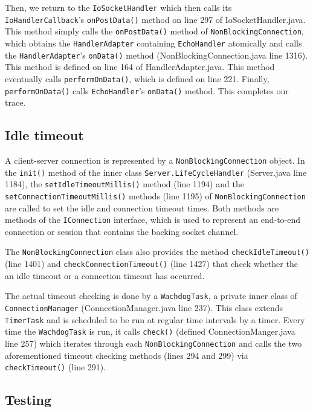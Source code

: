 \documentclass[letterpaper,12pt]{article}
\begin{document}
Then, we return to the \texttt{IoSocketHandler} which then calls its \texttt{IoHandlerCallback}'s \texttt{onPostData()} method on line 297 of IoSocketHandler.java. This method simply calls the \texttt{onPostData()} method of \texttt{NonBlockingConnection}, which obtains the \texttt{HandlerAdapter} containing \texttt{EchoHandler} atomically and calls the \texttt{HandlerAdapter}'s \texttt{onData()} method (NonBlockingConnection.java line 1316). This method is defined on line 164 of HandlerAdapter.java. This method eventually calls \texttt{performOnData()}, which is defined on line 221. Finally, \texttt{performOnData()} calls \texttt{EchoHandler}'s \texttt{onData()} method. This completes our trace.

\subsection{Idle timeout}

A client-server connection is represented by a \texttt{NonBlockingConnection} object. In the \texttt{init()} method of the inner class \texttt{Server.LifeCycleHandler} (Server.java line 1184), the \texttt{setIdleTimeoutMillis()} method (line 1194) and the \texttt{setConnectionTimeoutMillis()} methods (line 1195) of \texttt{NonBlockingConnection} are called to set the idle and connection timeout times. Both methods are methods of the \texttt{IConnection} interface, which is used to represent an end-to-end connection or session that contains the backing socket channel.

The \texttt{NonBlockingConnection} class also provides the method \texttt{checkIdleTimeout()} (line 1401) and \texttt{checkConnectionTimeout()} (line 1427) that check whether the an idle timeout or a connection timeout has occurred.

The actual timeout checking is done by a \texttt{WachdogTask}, a private inner class of \texttt{ConnectionManager} (ConnectionManager.java line 237). This class extends \texttt{TimerTask} and is scheduled to be run at regular time intervals by a timer. Every time the \texttt{WachdogTask} is run, it calls \texttt{check()} (defined ConnectionManger.java line 257) which iterates through each \texttt{NonBlockingConnection} and calls the two aforementioned timeout checking methods (lines 294 and 299) via \texttt{checkTimeout()} (line 291).

\subsection{Testing}
\end{document}
